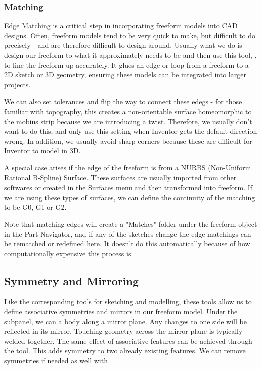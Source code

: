 \subsubsection{Matching}
\mediumdifficulty

Edge Matching is a critical step in incorporating freeform models into CAD designs. Often, freeform models tend to be very quick to make, but difficult to do precisely - and are therefore difficult to design around. Usually what we do is design our freeform to what it approximately needs to be and then use this tool, , to line the freeform up accurately. It glues an edge or loop from a freeform to a 2D sketch or 3D geometry, ensuring these models can be integrated into larger projects. 

We can also set tolerances and flip the way to connect these edegs - for those familiar with topography, this creates a non-orientable surface homeomorphic to the mobius strip because we are introducing a twist. Therefore, we usually don't want to do this, and only use this setting when Inventor gets the default direction wrong. In addition, we usually avoid sharp corners because these are difficult for Inventor to model in 3D. 

A special case arises if the edge of the freeform is from a NURBS (Non-Uniform Rational B-Spline) Surface. These surfaces are usually imported from other softwares or created in the Surfaces menu and then transformed into freeform. If we are using these types of surfaces, we can define the continuity of the matching to be G0, G1 or G2.

Note that matching edges will create a "Matches" folder under the freeform object in the Part Navigator, and if any of the sketches change the edge matchings can be rematched or redefined here. It doesn't do this automatically because of how computationally expensive this process is. 


\label{subsection:freeform-symmetry}
\subsection{Symmetry and Mirroring}
\easydifficulty

Like the corresponding tools for sketching and modelling, these tools allow us to define associative symmetries and mirrors in our freeform model. Under the  subpanel, we can  a body along a mirror plane. Any changes to one side will be reflected in its mirror. Touching geometry across the mirror plane is typically welded together. The same effect of associative features can be achieved through the  tool. This adds symmetry to two already existing features. We can remove symmetries if needed as well with .

